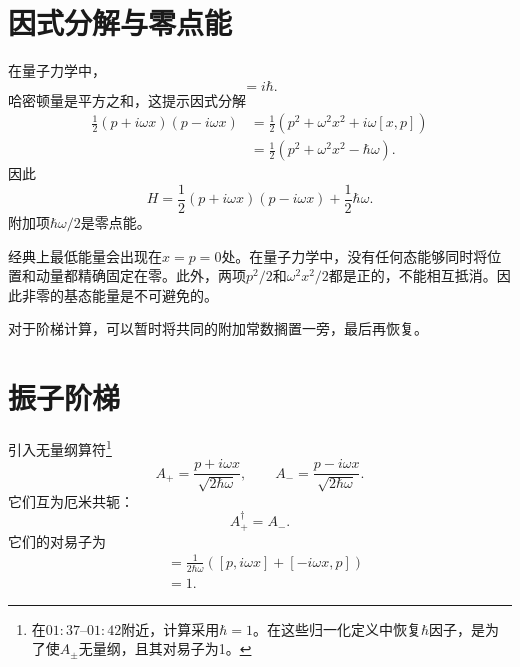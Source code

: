 \section{因式分解与零点能}

在量子力学中，
\begin{equation}
[x,p]=i\hbar.
\end{equation}
哈密顿量是平方之和，这提示因式分解
\begin{align}
\frac{1}{2}(p+i\omega x)(p-i\omega x)
&=\frac{1}{2}\left(p^2+\omega^2x^2+i\omega[x,p]\right) \\
&=\frac{1}{2}\left(p^2+\omega^2x^2-\hbar\omega\right).
\end{align}
因此
\begin{equation}
H=\frac{1}{2}(p+i\omega x)(p-i\omega x)
+\frac{1}{2}\hbar\omega.
\end{equation}
附加项\(\hbar\omega/2\)是零点能。

经典上最低能量会出现在\(x=p=0\)处。在量子力学中，没有任何态能够同时将位置和动量都精确固定在零。此外，两项\(p^2/2\)和\(\omega^2x^2/2\)都是正的，不能相互抵消。因此非零的基态能量是不可避免的。

对于阶梯计算，可以暂时将共同的附加常数搁置一旁，最后再恢复。

\begin{classroomqa}
\end{classroomqa}

\section{振子阶梯}

引入无量纲算符\footnote{在\(01{:}37\)--\(01{:}42\)附近，计算采用\(\hbar=1\)。在这些归一化定义中恢复\(\hbar\)因子，是为了使\(A_\pm\)无量纲，且其对易子为1。}
\begin{equation}
A_+=\frac{p+i\omega x}{\sqrt{2\hbar\omega}},
\qquad
A_-=\frac{p-i\omega x}{\sqrt{2\hbar\omega}}.
\end{equation}
它们互为厄米共轭：
\begin{equation}
A_+^\dagger=A_-.
\end{equation}
它们的对易子为
\begin{align}
[A_-,A_+]
&=\frac{1}{2\hbar\omega}
\left([p,i\omega x]+[-i\omega x,p]\right) \\
&=1.
\end{align}


